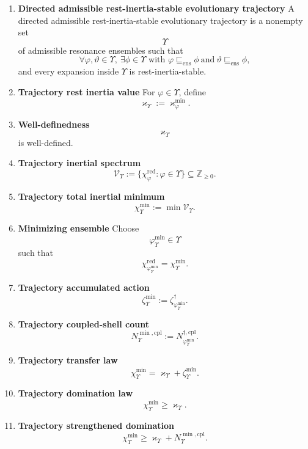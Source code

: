 \documentclass[11pt,letterpaper]{article}
\theoremstyle{plain}
\theoremstyle{definition}
\theoremstyle{remark}
\newcommand{\RestInertia}{\varkappa}
\newcommand{\TotInertia}{\chi}
\newcommand{\AccAction}{\zeta}
\newcommand{\ResEns}{\varphi}
\newcommand{\ResEnsAlt}{\vartheta}
\newcommand{\EvolTraj}{\Upsilon}
\newcommand{\InertialSpec}{\mathcal{V}}
\begin{document}
\begin{enumerate}[resume]
\item \textbf{Directed admissible rest-inertia-stable evolutionary trajectory}
A directed admissible rest-inertia-stable evolutionary trajectory is a nonempty set
\[
\EvolTraj
\]
of admissible resonance ensembles such that
\[
\forall \ResEns,\ResEnsAlt\in\EvolTraj,\ \exists \phi\in\EvolTraj
\text{ with }
\ResEns\sqsubseteq_{\mathrm{ens}}\phi
\ \text{and}\
\ResEnsAlt\sqsubseteq_{\mathrm{ens}}\phi,
\]
and every expansion inside \(\EvolTraj\) is rest-inertia-stable.

\item \textbf{Trajectory rest inertia value}
For \(\ResEns\in\EvolTraj\), define
\[
\RestInertia_{\EvolTraj}:=\RestInertia_{\ResEns}^{\min}.
\]

\item \textbf{Well-definedness}
\[
\RestInertia_{\EvolTraj}
\]
is well-defined.

\item \textbf{Trajectory inertial spectrum}
\[
\InertialSpec_{\EvolTraj}
:=
\{\TotInertia_{\ResEns}^{\mathrm{red}}:\ResEns\in\EvolTraj\}
\subseteq \mathbb Z_{\ge 0}.
\]

\item \textbf{Trajectory total inertial minimum}
\[
\TotInertia_{\EvolTraj}^{\min}
:=
\min \InertialSpec_{\EvolTraj}.
\]

\item \textbf{Minimizing ensemble}
Choose
\[
\ResEns_{\EvolTraj}^{\min}\in\EvolTraj
\]
such that
\[
\TotInertia_{\ResEns_{\EvolTraj}^{\min}}^{\mathrm{red}}
=
\TotInertia_{\EvolTraj}^{\min}.
\]

\item \textbf{Trajectory accumulated action}
\[
\AccAction_{\EvolTraj}^{\min}
:=
\AccAction_{\ResEns_{\EvolTraj}^{\min}}^{\dagger}.
\]

\item \textbf{Trajectory coupled-shell count}
\[
N_{\EvolTraj}^{\min, \mathrm{cpl}}
:=
N_{\ResEns_{\EvolTraj}^{\min}}^{\dagger, \mathrm{cpl}}.
\]

\item \textbf{Trajectory transfer law}
\[
\TotInertia_{\EvolTraj}^{\min}
=
\RestInertia_{\EvolTraj}+\AccAction_{\EvolTraj}^{\min}.
\]

\item \textbf{Trajectory domination law}
\[
\TotInertia_{\EvolTraj}^{\min}\ge \RestInertia_{\EvolTraj}.
\]

\item \textbf{Trajectory strengthened domination}
\[
\TotInertia_{\EvolTraj}^{\min}\ge \RestInertia_{\EvolTraj}+N_{\EvolTraj}^{\min, \mathrm{cpl}}.
\]


\end{enumerate}
\end{document}
